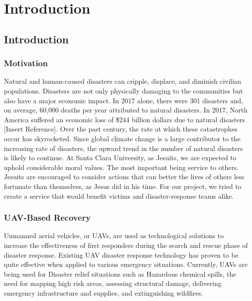 \chapter{Introduction}
\section{Introduction}
\subsection{Motivation}
Natural and human-caused disasters can cripple, displace, and diminish civilian populations. Disasters are not only physically damaging to the communities but also have a major economic impact. In 2017 alone, there were 301 disasters and, on average, 60,000 deaths per year attributed to natural disasters. In 2017, North America suffered an economic loss of \$244 billion dollars due to natural disasters [Insert Reference]. Over the past century, the rate at which these catastrophes occur has skyrocketed. Since global climate change is a large contributor to the increasing rate of disasters, the upward trend in the number of natural disasters is likely to continue.
At Santa Clara University, as Jesuits, we are expected to uphold considerable moral values. The most important being service to others. Jesuits are encouraged to consider actions that can better the lives of others less fortunate than themselves, as Jesus did in his time. For our project, we tried to create a service that would benefit victims and disaster-response teams alike. 

\subsection{UAV-Based Recovery}
Unmanned aerial vehicles, or UAVs, are used as technological solutions to increase the effectiveness of first responders during the search and rescue phase of disaster response. Existing UAV disaster response technology has proven to be quite effective when applied to various emergency situations. Currently, UAVs are being used for Disaster relief situations such as Hazardous chemical spills, the need for mapping high risk areas, assessing structural damage, delivering emergency infrastructure and supplies, and extinguishing wildfires.



